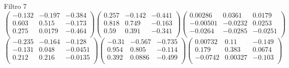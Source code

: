 Filtro 7
{ \small
\[
\begin{pmatrix}
  -0.132 & -0.197 & -0.384 \\
  0.603 & 0.515 & -0.173 \\
  0.275 & 0.0179 & -0.464 \\
\end{pmatrix}
\begin{pmatrix}
  0.257 & -0.142 & -0.441 \\
  0.818 & 0.749 & -0.163 \\
  0.59 & 0.391 & -0.341 \\
\end{pmatrix}
\begin{pmatrix}
  0.00286 & 0.0361 & 0.0179 \\
  -0.00501 & -0.0232 & 0.0253 \\
  -0.0264 & -0.0285 & -0.0251 \\
\end{pmatrix}
\]
\[
\begin{pmatrix}
  -0.235 & -0.164 & -0.128 \\
  -0.131 & 0.048 & -0.0451 \\
  0.212 & 0.216 & -0.0135 \\
\end{pmatrix}
\begin{pmatrix}
  -0.31 & -0.567 & -0.735 \\
  0.954 & 0.805 & -0.114 \\
  0.392 & 0.0886 & -0.499 \\
\end{pmatrix}
\begin{pmatrix}
  0.00732 & 0.11 & -0.149 \\
  0.179 & 0.383 & 0.0674 \\
  -0.0742 & 0.00327 & -0.103 \\
\end{pmatrix}
\]
}

